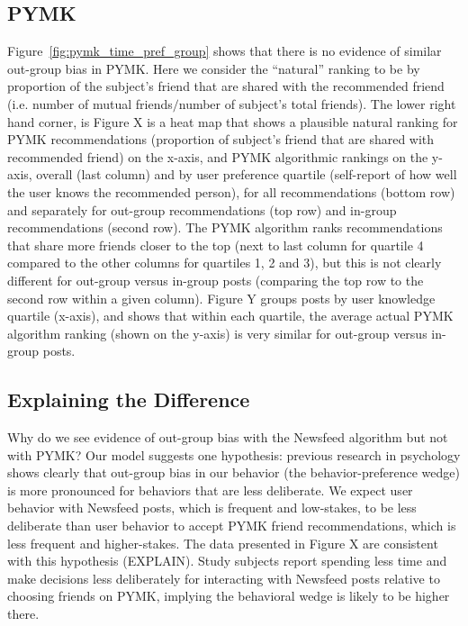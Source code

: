 \documentclass[12pt,letterpaper]{article}
\begin{document}
\subsection{PYMK}
Figure~\ref{fig:pymk_time_pref_group} shows that there is no evidence of similar out-group bias in PYMK. Here we consider the ``natural'' ranking to be by proportion of the subject's friend that are shared with the recommended friend (i.e. number of mutual friends$/$number of subject's total friends). The lower right hand corner, is  Figure X is a heat map that shows a plausible natural ranking for PYMK recommendations (proportion of subject's friend that are shared with recommended friend) on the x-axis, and PYMK algorithmic rankings on the y-axis, overall (last column) and by user preference quartile (self-report of how well the user knows the recommended person), for all recommendations (bottom row) and separately for out-group recommendations (top row) and in-group recommendations (second row). The PYMK algorithm ranks recommendations that share more friends closer to the top (next to last column for quartile 4 compared to the other columns for quartiles 1, 2 and 3), but this is not clearly different for out-group versus in-group posts (comparing the top row to the second row within a given column). Figure Y groups posts by user knowledge quartile (x-axis), and shows that within each quartile, the average actual PYMK algorithm ranking (shown on the y-axis) is very similar for out-group versus in-group posts.

\subsection{Explaining the Difference}
Why do we see evidence of out-group bias with the Newsfeed algorithm but not with PYMK? Our model suggests one hypothesis: previous research in psychology shows clearly that out-group bias in our behavior (the behavior-preference wedge) is more pronounced for behaviors that are less deliberate. We expect user behavior with Newsfeed posts, which is frequent and low-stakes, to be less deliberate than user behavior to accept PYMK friend recommendations, which is less frequent and higher-stakes. The data presented in Figure X are consistent with this hypothesis (EXPLAIN). Study subjects report spending less time and make decisions less deliberately for interacting with Newsfeed posts relative to choosing friends on PYMK, implying the behavioral wedge is likely to be higher there.
\end{document}
